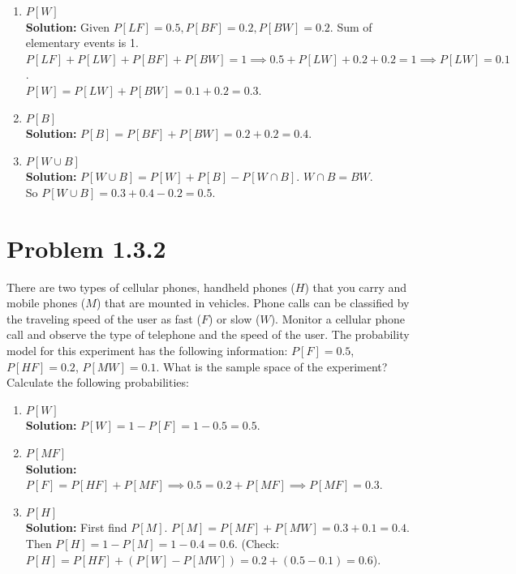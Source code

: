 \documentclass{article}
\begin{document}
\begin{enumerate}[label=(\alph*)]
    \item $P[W]$ \\
    \textbf{Solution:} Given $P[LF]=0.5, P[BF]=0.2, P[BW]=0.2$. Sum of elementary events is 1. \\
    $P[LF]+P[LW]+P[BF]+P[BW]=1 \implies 0.5+P[LW]+0.2+0.2=1 \implies P[LW]=0.1$. \\
    $P[W] = P[LW] + P[BW] = 0.1 + 0.2 = 0.3$.
    \item $P[B]$ \\
    \textbf{Solution:} $P[B] = P[BF] + P[BW] = 0.2 + 0.2 = 0.4$.
    \item $P[W \cup B]$ \\
    \textbf{Solution:} $P[W \cup B] = P[W] + P[B] - P[W \cap B]$. $W \cap B = BW$. \\
    So $P[W \cup B] = 0.3 + 0.4 - 0.2 = 0.5$.
\end{enumerate}

\newpage

\section*{Problem 1.3.2}
There are two types of cellular phones, handheld phones ($H$) that you carry and mobile phones ($M$) that are mounted in vehicles. Phone calls can be classified by the traveling speed of the user as fast ($F$) or slow ($W$). Monitor a cellular phone call and observe the type of telephone and the speed of the user. The probability model for this experiment has the following information: $P[F] = 0.5$, $P[HF] = 0.2$, $P[MW] = 0.1$. What is the sample space of the experiment? Calculate the following probabilities:

\begin{enumerate}[label=(\alph*)]
    \item $P[W]$ \\
    \textbf{Solution:} $P[W] = 1 - P[F] = 1 - 0.5 = 0.5$.
    \item $P[MF]$ \\
    \textbf{Solution:} $P[F] = P[HF] + P[MF] \implies 0.5 = 0.2 + P[MF] \implies P[MF] = 0.3$.
    \item $P[H]$ \\
    \textbf{Solution:} First find $P[M]$. $P[M] = P[MF] + P[MW] = 0.3 + 0.1 = 0.4$. \\
    Then $P[H] = 1 - P[M] = 1 - 0.4 = 0.6$. (Check: $P[H] = P[HF] + (P[W]-P[MW]) = 0.2 + (0.5-0.1) = 0.6$).
\end{enumerate}
\end{document}
